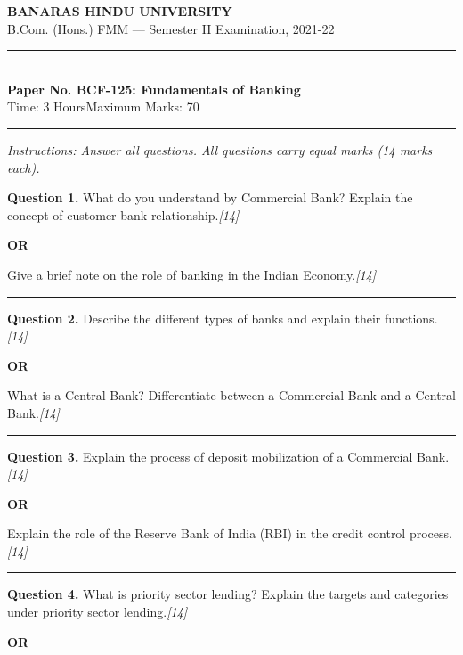 \documentclass[11pt,a4paper]{article}
\newcommand{\pts}[1]{\hfill   \textit{[#1]}}
\begin{document}
\begin{center}
  {\large\bfseries BANARAS HINDU UNIVERSITY}\\[2pt]
  {\normalsize B.Com. (Hons.) FMM --- Semester II Examination, 2021-22}\\[6pt]
  \rule{0.8\linewidth}{0.5pt}\\[6pt]
  {\large\bfseries Paper No. BCF-125: Fundamentals of Banking}\\[4pt]
  {\normalsize Time: 3 Hours\hfill Maximum Marks: 70}
\end{center}

\rule{\linewidth}{0.4pt}

\smallskip



\noindent   \textit{Instructions: Answer all questions. All questions carry equal marks (14 marks each).}

\bigskip




\noindent   \textbf{Question 1.}
What do you understand by Commercial Bank? Explain the concept of customer-bank relationship.\pts{14}

\centerline{   \textbf{OR}}

Give a brief note on the role of banking in the Indian Economy.\pts{14}

\medskip\rule{\linewidth}{0.2pt}




\noindent   \textbf{Question 2.}
Describe the different types of banks and explain their functions.\pts{14}

\centerline{   \textbf{OR}}

What is a Central Bank? Differentiate between a Commercial Bank and a Central Bank.\pts{14}

\medskip\rule{\linewidth}{0.2pt}




\noindent   \textbf{Question 3.}
Explain the process of deposit mobilization of a Commercial Bank.\pts{14}

\centerline{   \textbf{OR}}

Explain the role of the Reserve Bank of India (RBI) in the credit control process.\pts{14}

\medskip\rule{\linewidth}{0.2pt}




\noindent   \textbf{Question 4.}
What is priority sector lending? Explain the targets and categories under priority sector lending.\pts{14}

\centerline{   \textbf{OR}}
\end{document}
